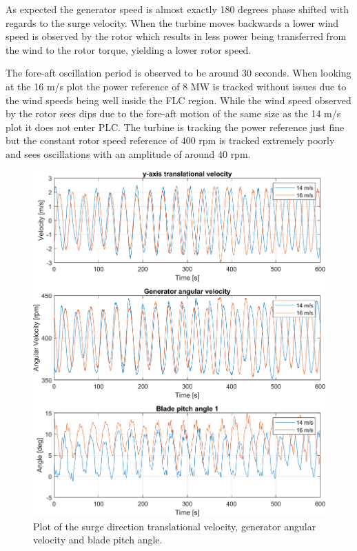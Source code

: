 As expected the generator speed is almost exactly 180 degrees phase shifted with regards to the surge velocity. When the turbine moves backwards a lower wind speed is observed by the rotor which results in less power being transferred from the wind to the rotor torque, yielding a lower rotor speed.

The fore-aft oscillation period is observed to be around 30 seconds. When looking at the 16 m/s plot the power reference of 8 MW is tracked without issues due to the wind speeds being well inside the FLC region. While the wind speed observed by the rotor sees dips due to the fore-aft motion of the same size as the 14 m/s plot it does not enter PLC. The turbine is tracking the power reference just fine but the constant rotor speed reference of 400 rpm is tracked extremely poorly and sees oscillations with an amplitude of around 40 rpm.
\begin{figure}[ht]
	\centering
	\includegraphics[width=0.8\linewidth]{Graphics/TestResults/tj02/uykf_omgen_pi1.png}
	\caption{Plot of the surge direction translational velocity, generator angular velocity and blade pitch angle.}
	\label{fig:tj02_uykf_to_pi1}
\end{figure}
